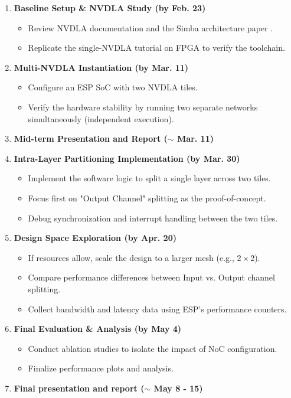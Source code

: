 \documentclass[10pt,sigconf,nonacm]{acmart}
\begin{document}
\begin{enumerate}
  \item \textbf{Baseline Setup \& NVDLA Study (by Feb. 23)}
  \begin{itemize}
      \item Review NVDLA documentation \cite{nvdla_web} and the Simba architecture paper \cite{simba}.
      \item Replicate the single-NVDLA tutorial on FPGA to verify the toolchain.
  \end{itemize}
  
  \item \textbf{Multi-NVDLA Instantiation (by Mar. 11)}
  \begin{itemize}
      \item Configure an ESP SoC with two NVDLA tiles.
      \item Verify the hardware stability by running two separate networks simultaneously (independent execution).
  \end{itemize}
  
  \item \textbf{Mid-term Presentation and Report ($\sim$ Mar. 11)}
  
  \item \textbf{Intra-Layer Partitioning Implementation (by Mar. 30)}
  \begin{itemize}
      \item Implement the software logic to split a single layer across two tiles.
      \item Focus first on "Output Channel" splitting as the proof-of-concept.
      \item Debug synchronization and interrupt handling between the two tiles.
  \end{itemize}
  
  \item \textbf{Design Space Exploration (by Apr. 20)}
  \begin{itemize}
      \item If resources allow, scale the design to a larger mesh (e.g., $2 \times 2$).
      \item Compare performance differences between Input vs. Output channel splitting.
      \item Collect bandwidth and latency data using ESP's performance counters.
  \end{itemize}
  
  \item \textbf{Final Evaluation \& Analysis (by May 4)}
  \begin{itemize}
      \item Conduct ablation studies to isolate the impact of NoC configuration.
      \item Finalize performance plots and analysis.
  \end{itemize}
  
  \item \textbf{Final presentation and report ($\sim$ May 8 - 15)}
\end{enumerate}
\end{document}
